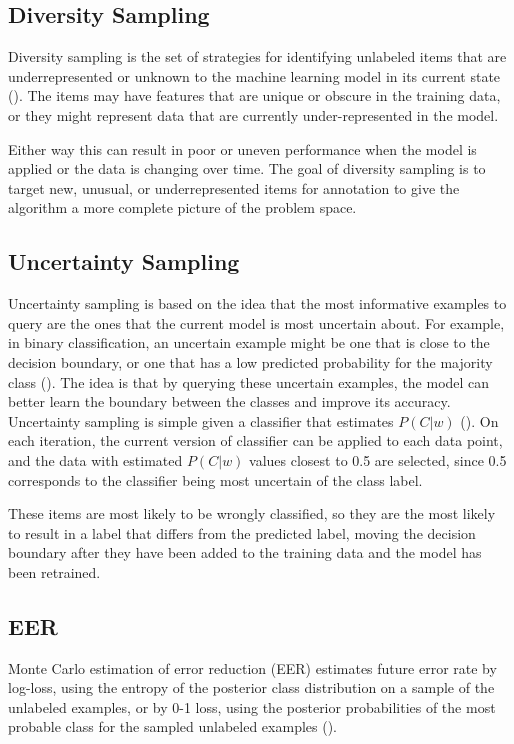 \subsection{Diversity Sampling}

Diversity sampling is the set of strategies for identifying unlabeled items that are underrepresented or unknown to the machine learning model in its current state (\cite{munro2021human}). The items may have features that are unique or obscure in the training data, or they might represent data that are currently under-represented in the model. 

Either way this can result in poor or uneven performance when the model is applied or the data is changing over time. The goal of diversity sampling is to target new, unusual, or underrepresented items for annotation to give the algorithm a more complete picture of the problem space. 

\subsection{Uncertainty Sampling}

Uncertainty sampling is based on the idea that the most informative examples to query are the ones that the current model is most uncertain about. For example, in binary classification, an uncertain example might be one that is close to the decision boundary, or one that has a low predicted probability for the majority class (\cite{munro2021human}). The idea is that by querying these uncertain examples, the model can better learn the boundary between the classes and improve its accuracy. Uncertainty sampling is simple given a classifier that estimates $P (C|w)$ (\cite{lewis1994uncertainty}). On each iteration, the current version of classifier can be applied to each data point, and the data with estimated $P(C|w)$ values closest to 0.5 are selected, since 0.5 corresponds to the classifier being most uncertain of the class label.

These items are most likely to be wrongly classified, so they are the most likely to result in a label that differs from the predicted label, moving the decision boundary after they have been added to the training data and the model has been retrained.

\subsection{EER}
Monte Carlo estimation of error reduction (EER) estimates future error rate by log-loss, using the entropy of the posterior class distribution on a sample of the unlabeled examples, or by 0-1 loss, using the posterior probabilities of the most probable class for the sampled unlabeled examples (\cite{roy2001eer}).

